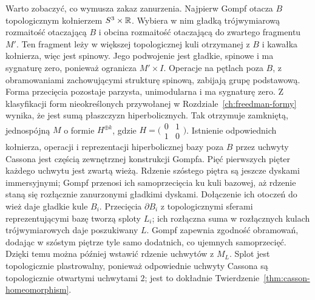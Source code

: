 \begin{uwaga}
\label{rem:egzotyczne-r4-mechanizm}
Warto zobaczyć, co wymusza zakaz zanurzenia.
Najpierw Gompf otacza $B$ topologicznym kołnierzem
$S^3\times\mathbb{R}$. Wybiera w nim gładką
trójwymiarową rozmaitość otaczającą $B$
i obcina rozmaitość otaczającą do zwartego fragmentu
$M'$. Ten fragment leży w większej topologicznej
kuli otrzymanej z $B$ i kawałka kołnierza, więc
jest spinowy. Jego podwojenie jest gładkie,
spinowe i ma sygnaturę zero, ponieważ ogranicza
$M'\times I$. Operacje na pętlach poza $B$,
z obramowaniami zachowującymi strukturę spinową,
zabijają grupę podstawową. Forma przecięcia
pozostaje parzysta, unimodularna i ma sygnaturę
zero. Z klasyfikacji form nieokreślonych przywołanej
w Rozdziale~\ref{ch:freedman-formy} wynika, że jest
sumą płaszczyzn hiperbolicznych. Tak otrzymuje zamkniętą,
jednospójną $M$ o formie
$H^{\oplus k}$, gdzie
$H=\bigl(\begin{smallmatrix}0&1\\1&0\end{smallmatrix}\bigr)$.
Istnienie odpowiednich kołnierza, operacji i
reprezentacji hiperbolicznej bazy poza $B$ przez
uchwyty Cassona jest częścią zewnętrznej
konstrukcji Gompfa. Pięć pierwszych pięter
każdego uchwytu jest zwartą wieżą. Rdzenie
szóstego piętra są jeszcze dyskami immersyjnymi;
Gompf przenosi ich samoprzecięcia ku kuli bazowej,
aż rdzenie staną się rozłącznie zanurzonymi
gładkimi dyskami. Dołączenie ich otoczeń do wież
daje gładkie kule $B_i$.
Przecięcia $\partial B_i$ z topologicznymi
sferami reprezentującymi bazę tworzą sploty $L_i$;
ich rozłączna suma w rozłącznych kulach
trójwymiarowych daje poszukiwany $L$.
Gompf zapewnia zgodność obramowań, dodając
w szóstym piętrze tyle samo dodatnich, co
ujemnych samoprzecięć. Dzięki temu można później
wstawić rdzenie uchwytów z $M_L$.
Splot jest topologicznie plastrowalny, ponieważ
odpowiednie uchwyty Cassona są topologicznie
otwartymi uchwytami $2$; jest to dokładnie
Twierdzenie~\ref{thm:casson-homeomorphism}.


\end{uwaga}

